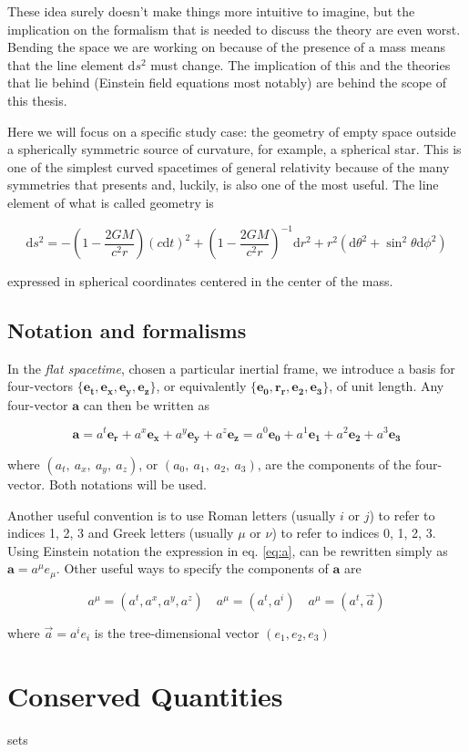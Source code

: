 These idea surely doesn't make things more intuitive to imagine, but the
implication on the formalism that is needed to discuss the theory are even
worst.
Bending the space we are working on because of the presence of a mass means
that the line element $\mathrm{d}s^2$ must change.
The implication of this and the theories that lie behind (Einstein field
equations most notably) are behind the scope of this thesis.

Here we will focus on a specific study case: the geometry of empty space
outside a spherically symmetric source of curvature, for example, a spherical
star.
This is one of the simplest curved spacetimes of general relativity because of
the many symmetries that presents and, luckily, is also one of the most useful.
The line element of what is called \Sh{} geometry is

\begin{equation}
    \mathrm{d}s^2 = - \left(1 - \frac{2 G M}{c^2 r} \right) (c \mathrm{d}t)^2
    + \left(1 - \frac{2 G M}{c^2 r} \right)^{-1} \mathrm{d}r^2
    + r^2 (\mathrm{d}\theta^2 + \sin^2 \theta \mathrm{d}\phi^2)
    \label{eq:Sh_ds}
\end{equation}

expressed in spherical coordinates centered in the center of the mass.


\subsection{Notation and formalisms}
\label{ssec:notation}
In the \textit{flat spacetime}, chosen a particular inertial frame, we
introduce a basis for four-vectors
$\{ \mathbf{e_t}, \mathbf{e_x}, \mathbf{e_y}, \mathbf{e_z} \}$, or equivalently
$\{ \mathbf{e_0}, \mathbf{r_r}, \mathbf{e_2}, \mathbf{e_3} \}$, of unit length.
Any four-vector $\textbf{a}$ can then be written as

\begin{equation}
    \textbf{a}
    = a^t \mathbf{e_r} + a^x \mathbf{e_x} + a^y \mathbf{e_y} + a^z \mathbf{e_z}
    = a^0 \mathbf{e_0} + a^1 \mathbf{e_1} + a^2 \mathbf{e_2} + a^3 \mathbf{e_3}
    \label{eq:a}
\end{equation}

where $(a_t,~a_x,~a_y,~a_z)$, or $(a_0,~a_1,~a_2,~a_3)$, are the components of
the four-vector.
Both notations will be used.

Another useful convention is to use Roman letters (usually $i$ or $j$) to refer
to indices 1, 2, 3 and Greek letters (usually $\mu$ or $\nu$) to refer to
indices 0, 1, 2, 3.
Using Einstein notation the expression in eq. \ref{eq:a}, can be rewritten
simply as $\textbf{a} = a^\mu e_\mu$.
Other useful ways to specify the components of $\textbf{a}$ are

\begin{equation}
    a^\mu = (a^t, a^x, a^y, a^z) \quad a^\mu = (a^t, a^i) \quad a^\mu
    = (a^t, \vec a)
    \label{eq:a_notation}
\end{equation}

where $\vec a = a^i e_i$ is the tree-dimensional vector $(e_1, e_2, e_3)$









\section{Conserved Quantities}
\Glspl{set}

